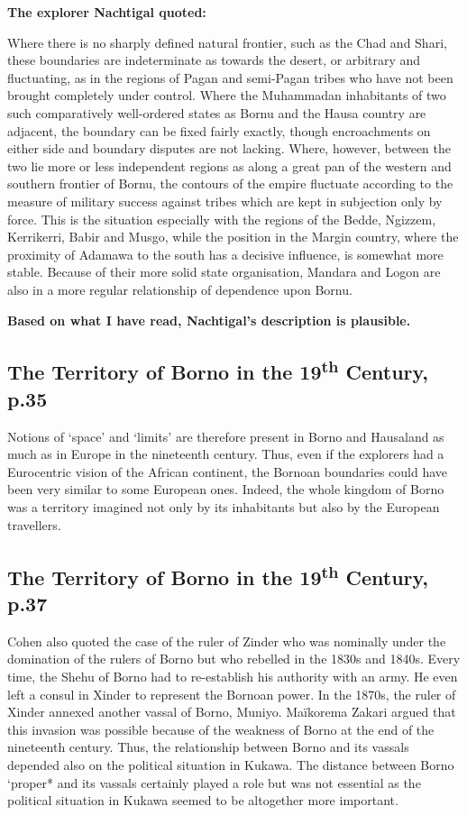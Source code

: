 \documentclass[12pt]{article}
\begin{document}
\textbf{The explorer Nachtigal quoted:}

Where there is no sharply defined natural frontier, such as the Chad and Shari,
these boundaries are indeterminate as towards the desert, or arbitrary and
fluctuating, as in the regions of Pagan and semi-Pagan tribes who have not been
brought completely under control. Where the Muhammadan inhabitants of two such
comparatively well-ordered states as Bornu and the Hausa country are adjacent,
the boundary can be fixed fairly exactly, though encroachments on either side
and boundary disputes are not lacking. Where, however, between the two
lie more or less independent regions as along a great pan of the western and
southern frontier of Bornu, the contours of the empire fluctuate according to
the measure of military success against tribes which are kept in subjection only
by force. This is the situation especially with the regions of the Bedde,
Ngizzem, Kerrikerri, Babir and Musgo, while the position in the Margin country,
where the proximity of Adamawa to the south has a decisive influence, is
somewhat more stable. Because of their more solid state organisation, Mandara
and Logon are also in a more regular relationship of dependence upon Bornu.

\textbf{Based on what I have read, Nachtigal's description is plausible.}

\subsection{The Territory of Borno in the 19\textsuperscript{th} Century, p.35}

Notions of `space' and `limits' are therefore present in Borno and Hausaland as
much as in Europe in the nineteenth century. Thus, even if the explorers had a
Eurocentric vision of the African continent, the Bornoan boundaries could have
been very similar to some European ones. Indeed, the whole kingdom of Borno was
a territory imagined not only by its inhabitants but also by the European
travellers.

\subsection{The Territory of Borno in the 19\textsuperscript{th} Century, p.37}

Cohen also quoted the case of the ruler of Zinder who was nominally under the
domination of the rulers of Borno but who rebelled in the 1830s and 1840s. Every
time, the Shehu of Borno had to re-establish his authority with an army. He
even left a consul in Xinder to represent the Bornoan power. In the 1870s, the
ruler of Xinder annexed another vassal of Borno, Muniyo. Maïkorema Zakari argued
that this invasion was possible because of the weakness of Borno at the end of
the nineteenth century. Thus, the relationship between Borno and its vassals
depended also on the political situation in Kukawa. The distance between Borno
`proper* and its vassals certainly played a role but was not essential as the
political situation in Kukawa seemed to be altogether more important.
\end{document}
